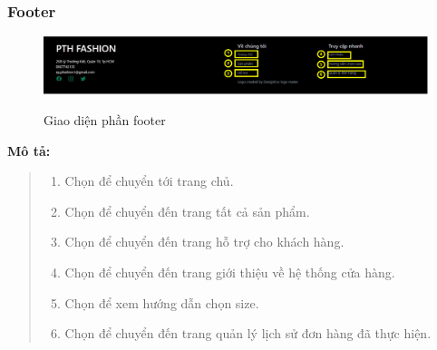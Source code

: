     \subsubsection{Footer}
    \begin{figure}[!htp]
        \centering
        \includegraphics[width=5in]{img/UI/new_customer/footer.png}
        \label{7}
        \newline
        \caption{Giao diện phần footer}
    \end{figure}
    \textbf{Mô tả:}  
    \begin{quote}
        \begin{enumerate}
            \item Chọn để chuyển tới trang chủ.
            \item Chọn để chuyển đến trang tất cả sản phẩm.
            \item Chọn để chuyển đến trang hỗ trợ cho khách hàng.
            \item Chọn để chuyển đến trang giới thiệu về hệ thống cửa hàng.
            \item Chọn để xem hướng dẫn chọn size.
            \item Chọn để chuyển đến trang quản lý lịch sử đơn hàng đã thực hiện.
        \end{enumerate}
    \end{quote}
   
    \newpage
